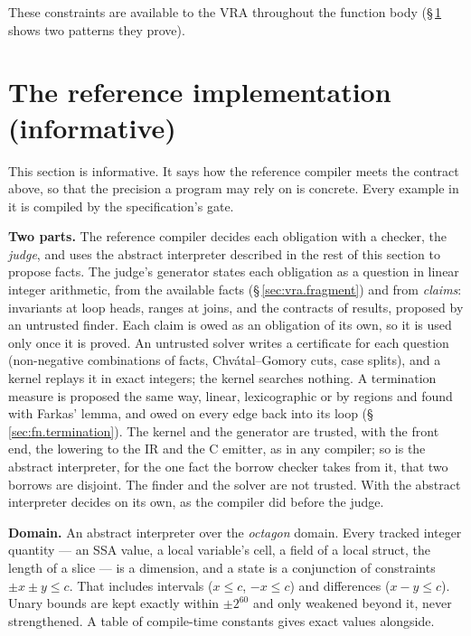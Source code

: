 These constraints are available to the VRA throughout the function body
(\S\,\ref{sec:vra.reference} shows two patterns they prove).

\section{The reference implementation (informative)}
\label{sec:vra.reference}

\pnum
This section is informative. It says how the reference compiler meets the contract above, so
that the precision a program may rely on is concrete. Every example in it is compiled by the
specification's gate.

\pnum
\textbf{Two parts.} The reference compiler decides each obligation with a checker, the
\emph{judge}, and uses the abstract interpreter described in the rest of this section to propose
facts. The judge's generator states each obligation as a question in linear integer arithmetic,
from the available facts (\S\,\ref{sec:vra.fragment}) and from \emph{claims}: invariants at loop
heads, ranges at joins, and the contracts of results, proposed by an untrusted finder. Each claim
is owed as an obligation of its own, so it is used only once it is proved. An untrusted solver
writes a certificate for each question (non-negative combinations of facts, Chv\'atal--Gomory
cuts, case splits), and a kernel replays it in exact integers; the kernel searches nothing. A
termination measure is proposed the same way, linear, lexicographic or by regions and found with
Farkas' lemma, and owed on every edge back into its loop (\S\,\ref{sec:fn.termination}). The
kernel and the generator are trusted, with the front end, the lowering to the IR and the C
emitter, as in any compiler; so is the abstract interpreter, for the one fact the borrow checker
takes from it, that two borrows are disjoint. The finder and the solver are not trusted. With
 the abstract interpreter decides on its own, as the compiler did before the
judge.

\pnum
\textbf{Domain.} An abstract interpreter over the \emph{octagon} domain. Every tracked integer
quantity --- an SSA value, a local variable's cell, a field of a local struct, the length of a
slice --- is a dimension, and a state is a conjunction of constraints $\pm x \pm y \leq c$. That
includes intervals ($x \leq c$, $-x \leq c$) and differences ($x - y \leq c$). Unary bounds are
kept exactly within $\pm 2^{60}$ and only weakened beyond it, never strengthened. A table of
compile-time constants gives exact values alongside.


